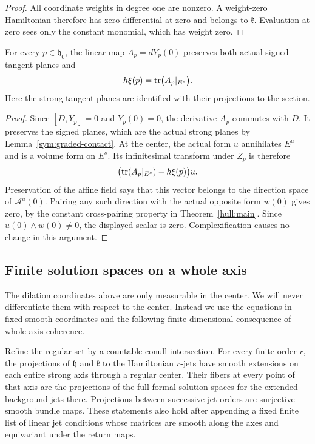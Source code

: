 \begin{proof}
All coordinate weights in degree one are nonzero.  A weight-zero
Hamiltonian therefore has zero differential at zero and belongs to
$\mathfrak k$.  Evaluation at zero sees only the constant monomial,
which has weight zero.
\end{proof}

\begin{lemma}
\label{sym:trace}
For every $p\in\mathfrak h_0$, the linear map
$A_p=dY_p(0)$ preserves both actual signed tangent planes and
\begin{equation}
 \label{sym:geometric-trace}
 h\xi(p)=\operatorname{tr}\bigl(A_p|_{E^s}\bigr).
\end{equation}
Here the strong tangent planes are identified with their projections
to the section.
\end{lemma}

\begin{proof}
Since $[D,Y_p]=0$ and $Y_p(0)=0$, the derivative $A_p$ commutes with
$D$.  It preserves the signed planes, which are the actual strong
planes by Lemma~\ref{sym:graded-contact}.  At the center, the actual
form $u$ annihilates $E^u$ and is a volume form on $E^s$.  Its
infinitesimal transform under $Z_p$ is therefore
\[
 \bigl(\operatorname{tr}(A_p|_{E^s})-h\xi(p)\bigr)u.
\]
Preservation of the affine field says that this vector belongs to
the direction space of $\mathcal A^u(0)$.  Pairing any such direction
with the actual opposite form $w(0)$ gives zero, by the constant
cross-pairing property in Theorem~\ref{hull:main}.  Since
$u(0)\wedge w(0)\ne0$, the displayed scalar is zero.  Complexification
causes no change in this argument.
\end{proof}

\subsection{Finite solution spaces on a whole axis}

The dilation coordinates above are only measurable in the center.
We will never differentiate them with respect to the center.
Instead we use the equations in fixed smooth coordinates and the
following finite-dimensional consequence of whole-axis coherence.

\begin{lemma}
\label{sym:full-projections}
Refine the regular set by a countable conull intersection.  For every
finite order $r$, the projections of $\mathfrak h$ and
$\mathfrak k$ to the Hamiltonian $r$-jets have smooth extensions on
each entire strong axis through a regular center.  Their fibers at
every point of that axis are the projections of the full formal
solution spaces for the extended background jets there.  Projections
between successive jet orders are surjective smooth bundle maps.
These statements also hold after appending a fixed finite list of
linear jet conditions whose matrices are smooth along the axes and
equivariant under the return maps.
\end{lemma}

